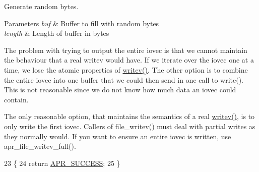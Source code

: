 Generate random bytes. 
\begin{DoxyParams}{Parameters}
{\em buf} & Buffer to fill with random bytes \\
\hline
{\em length} & Length of buffer in bytes \\
\hline
\end{DoxyParams}
The problem with trying to output the entire iovec is that we cannot maintain the behaviour that a real writev would have. If we iterate over the iovec one at a time, we lose the atomic properties of \hyperlink{apr__arch__os2calls_8h_a3d0f3996136a9b5ab46431c60c746efd}{writev()}. The other option is to combine the entire iovec into one buffer that we could then send in one call to write(). This is not reasonable since we do not know how much data an iovec could contain.

The only reasonable option, that maintains the semantics of a real \hyperlink{apr__arch__os2calls_8h_a3d0f3996136a9b5ab46431c60c746efd}{writev()}, is to only write the first iovec. Callers of file\+\_\+writev() must deal with partial writes as they normally would. If you want to ensure an entire iovec is written, use apr\+\_\+file\+\_\+writev\+\_\+full().
\begin{DoxyCode}
23 \{
24     \textcolor{keywordflow}{return} \hyperlink{group__apr__errno_ga9ee311b7bf1c691dc521d721339ee2a6}{APR\_SUCCESS};
25 \}
\end{DoxyCode}
